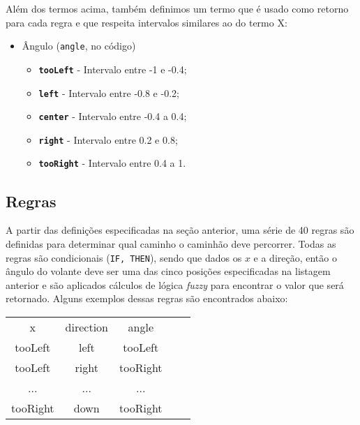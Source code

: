 \documentclass{article}
\begin{document}
        Além dos termos acima, também definimos um termo que é usado como
        retorno para cada regra e que respeita intervalos similares ao do termo
        X:
        
        \newpage
        \begin{itemize}
            \item Ângulo (\texttt{angle}, no código)
            \begin{itemize}
                \item \texttt{\textbf{tooLeft}} - Intervalo entre -1 e -0.4;
                \item \texttt{\textbf{left}} - Intervalo entre -0.8 e -0.2;
                \item \texttt{\textbf{center}} - Intervalo entre -0.4 a 0.4;
                \item \texttt{\textbf{right}} - Intervalo entre 0.2 e 0.8;
                \item \texttt{\textbf{tooRight}} - Intervalo entre 0.4 a 1.
            \end{itemize}
        \end{itemize}
    
    \subsection*{Regras}
        A partir das definições especificadas na seção anterior, uma série de
        40 regras são definidas para determinar qual caminho o caminhão deve
        percorrer. Todas as regras são condicionais (\texttt{IF, THEN}), sendo
        que dados os $x$ e a direção, então o ângulo do volante deve ser uma
        das cinco posições especificadas na listagem anterior e são aplicados
        cálculos de lógica \textit{fuzzy} para encontrar o valor que será
        retornado. Alguns exemplos dessas regras são encontrados abaixo:
        
        \begin{center}
            \begin{tabular}{c c c c c}
                \hline
                 x & direction & angle \\
                 tooLeft & left & tooLeft \\
                 tooLeft & right & tooRight \\
                 ... & ... & ... \\
                 tooRight & down & tooRight \\
                 
                \hline
            \end{tabular}
        \end{center}
        
\end{document}
